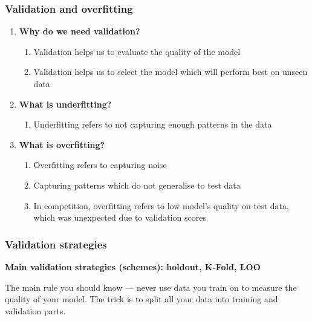 \documentclass[11pt, twoside]{article}   	%
\begin{document}
\subsubsection{Validation and overfitting}
\begin{enumerate}
  \item  \textbf{Why do we need validation? }
    \begin{enumerate}
        \item Validation helps us to evaluate the quality of the model
        \item Validation helps us to select the model which will perform best on unseen data
     \end{enumerate}
   \item  \textbf{What is underfitting? }
    \begin{enumerate}
        \item Underfitting refers to not capturing enough patterns in the data
     \end{enumerate}
     
   \item  \textbf{What is overfitting? }
    \begin{enumerate}
        \item Overfitting refers to capturing noise
        \item Capturing patterns which do not generalise to test data
        \item In competition, overfitting refers to low model's quality on test data, which was unexpected due to validation scores
     \end{enumerate}
 
  \end{enumerate}

\subsubsection{Validation strategies}

\textbf{Main validation strategies (schemes): holdout, K-Fold, LOO}

The main rule you should know — never use data you train on to measure the quality of your model. The trick is to split all your data into training and validation parts.
\end{document}
